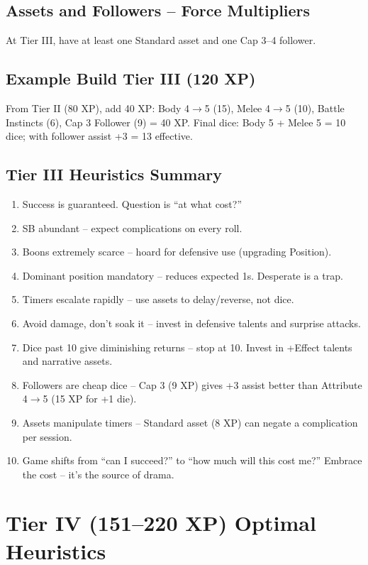 \documentclass[11pt]{article}
\begin{document}
\subsection{Assets and Followers -- Force Multipliers}
At Tier III, have at least one Standard asset and one Cap 3--4 follower.

\subsection{Example Build Tier III (120 XP)}
From Tier II (80 XP), add 40 XP: Body 4$\rightarrow$5 (15), Melee 4$\rightarrow$5 (10), Battle Instincts (6), Cap 3 Follower (9) = 40 XP. Final dice: Body 5 + Melee 5 = 10 dice; with follower assist +3 = 13 effective.

\subsection{Tier III Heuristics Summary}
\begin{enumerate}
    \item Success is guaranteed. Question is ``at what cost?''
    \item SB abundant -- expect complications on every roll.
    \item Boons extremely scarce -- hoard for defensive use (upgrading Position).
    \item Dominant position mandatory -- reduces expected 1s. Desperate is a trap.
    \item Timers escalate rapidly -- use assets to delay/reverse, not dice.
    \item Avoid damage, don't soak it -- invest in defensive talents and surprise attacks.
    \item Dice past 10 give diminishing returns -- stop at 10. Invest in +Effect talents and narrative assets.
    \item Followers are cheap dice -- Cap 3 (9 XP) gives +3 assist better than Attribute 4$\rightarrow$5 (15 XP for +1 die).
    \item Assets manipulate timers -- Standard asset (8 XP) can negate a complication per session.
    \item Game shifts from ``can I succeed?'' to ``how much will this cost me?'' Embrace the cost -- it's the source of drama.
\end{enumerate}

\section{Tier IV (151--220 XP) Optimal Heuristics}
\end{document}
